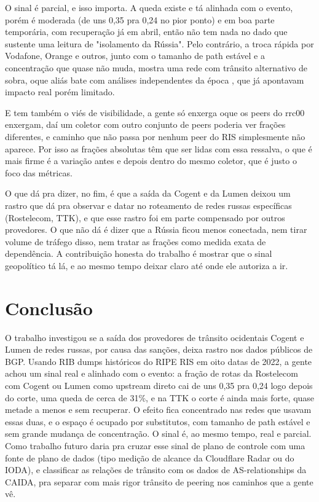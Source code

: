 \documentclass[12pt]{article}
\begin{document}
O sinal é parcial, e isso importa. A queda existe e tá alinhada com o evento, porém é moderada (de uns 0,35 pra 0,24 no pior ponto) e em boa parte temporária, com recuperação já em abril, então não tem nada no dado que sustente uma leitura de "isolamento da Rússia". Pelo contrário, a troca rápida por Vodafone, Orange e outros, junto com o tamanho de path estável e a concentração que quase não muda, mostra uma rede com trânsito alternativo de sobra, oque aliás bate com análises independentes da época \cite{madory}, que já apontavam impacto real porém limitado.

E tem também o viés de visibilidade, a gente só enxerga oque os peers do rrc00 enxergam, daí um coletor com outro conjunto de peers poderia ver frações diferentes, e caminho que não passa por nenhum peer do RIS simplesmente não aparece. Por isso as frações absolutas têm que ser lidas com essa ressalva, o que é mais firme é a variação antes e depois dentro do mesmo coletor, que é justo o foco das métricas.

O que dá pra dizer, no fim, é que a saída da Cogent e da Lumen deixou um rastro que dá pra observar e datar no roteamento de redes russas específicas (Rostelecom, TTK), e que esse rastro foi em parte compensado por outros provedores. O que não dá é dizer que a Rússia ficou menos conectada, nem tirar volume de tráfego disso, nem tratar as frações como medida exata de dependência. A contribuição honesta do trabalho é mostrar que o sinal geopolítico tá lá, e ao mesmo tempo deixar claro até onde ele autoriza a ir.

\section{Conclusão}
\label{sec:conclusao}

O trabalho investigou se a saída dos provedores de trânsito ocidentais Cogent e Lumen de redes russas, por causa das sanções, deixa rastro nos dados públicos de BGP. Usando RIB dumps históricos do RIPE RIS em oito datas de 2022, a gente achou um sinal real e alinhado com o evento: a fração de rotas da Rostelecom com Cogent ou Lumen como upstream direto cai de uns 0,35 pra 0,24 logo depois do corte, uma queda de cerca de 31\%, e na TTK o corte é ainda mais forte, quase metade a menos e sem recuperar. O efeito fica concentrado nas redes que usavam essas duas, e o espaço é ocupado por substitutos, com tamanho de path estável e sem grande mudança de concentração. O sinal é, ao mesmo tempo, real e parcial. Como trabalho futuro daria pra cruzar esse sinal de plano de controle com uma fonte de plano de dados (tipo medição de alcance da Cloudflare Radar ou do IODA), e classificar as relações de trânsito com os dados de AS-relationships da CAIDA, pra separar com mais rigor trânsito de peering nos caminhos que a gente vê.
\end{document}

